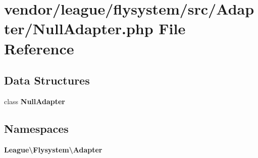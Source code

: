 \section{vendor/league/flysystem/src/\+Adapter/\+Null\+Adapter.php File Reference}
\label{_null_adapter_8php}
\subsection*{Data Structures}
\begin{DoxyCompactItemize}
\item 
class {\bf Null\+Adapter}
\end{DoxyCompactItemize}
\subsection*{Namespaces}
\begin{DoxyCompactItemize}
\item 
 {\bf League\textbackslash{}\+Flysystem\textbackslash{}\+Adapter}
\end{DoxyCompactItemize}

